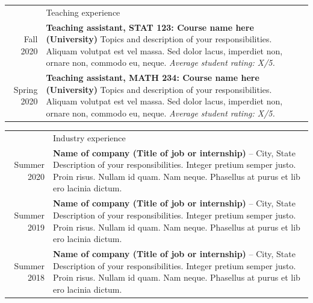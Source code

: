 \documentclass[letterpaper, 11pt]{article}
\newcommand{\headingfont}{\Large\color{OliveGreen}}
\newenvironment{SectionTable}[1]{
	\renewcommand*{\arraystretch}{1.4}
	\setlength{\tabcolsep}{10pt}
	\begin{longtable}{Rp{5.2in}} & #1 \\}
{\end{longtable}\vspace{-.3cm}}
\begin{document}

\begin{SectionTable}{\headingfont Teaching experience}
Fall 2020 & 
\textbf{Teaching assistant, STAT 123: Course name here (University)} \newline
Topics and description of your responsibilities. Aliquam volutpat est vel massa. Sed dolor lacus, imperdiet non, ornare non, commodo eu, neque. \newline
\textit{Average student rating: X/5.} \\

Spring 2020 & 
\textbf{Teaching assistant, MATH 234: Course name here (University)} \newline
Topics and description of your responsibilities. Aliquam volutpat est vel massa. Sed dolor lacus, imperdiet non, ornare non, commodo eu, neque. \newline
\textit{Average student rating: X/5.}
\end{SectionTable}


\begin{SectionTable}{\headingfont Industry experience}
Summer 2020 &
\textbf{Name of company (Title of job or internship)} -- City, State \newline
Description of your responsibilities. Integer pretium semper justo. Proin risus. Nullam id quam. Nam neque. Phasellus at purus et lib ero lacinia dictum.  \\

Summer 2019 &
\textbf{Name of company (Title of job or internship)} -- City, State \newline
Description of your responsibilities. Integer pretium semper justo. Proin risus. Nullam id quam. Nam neque. Phasellus at purus et lib ero lacinia dictum.  \\

Summer 2018 &
\textbf{Name of company (Title of job or internship)} -- City, State \newline
Description of your responsibilities. Integer pretium semper justo. Proin risus. Nullam id quam. Nam neque. Phasellus at purus et lib ero lacinia dictum.  \\
\end{SectionTable}

\end{document}
